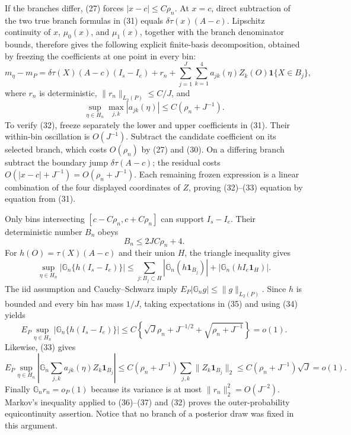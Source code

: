 If the branches differ, (27) forces \(|x-c|\le C\rho_n\).  At \(x=c\), direct subtraction of the two true branch formulas in (31) equals
\(\delta\tau(x)(A-c)\).  Lipschitz continuity of \(x\), \(\mu_0(x)\), and \(\mu_1(x)\), together with the branch denominator bounds, therefore gives the following explicit finite-basis decomposition, obtained by freezing the coefficients at one point in every bin:
\begin{equation}
 m_\eta-m_P
 =\delta\tau(X)(A-c)(I_s-I_e)+r_n+
   \sum_{j=1}^J\sum_{k=1}^4 a_{jk}(\eta)Z_k(O)\mathbf1\{X\in B_j\},                    \tag{32}
\end{equation}
where \(r_n\) is deterministic, \(\|r_n\|_{L_2(P)}\le C/J\), and
\begin{equation}
 \sup_{\eta\in H_n}\max_{j,k}|a_{jk}(\eta)|\le C(\rho_n+J^{-1}).                      \tag{33}
\end{equation}
To verify (32), freeze separately the lower and upper coefficients in (31).  Their within-bin oscillation is \(O(J^{-1})\).  Subtract the candidate coefficient on its selected branch, which costs \(O(\rho_n)\) by (27) and (30).  On a differing branch subtract the boundary jump \(\delta\tau(A-c)\); the residual costs \(O(|x-c|+J^{-1})=O(\rho_n+J^{-1})\).  Each remaining frozen expression is a linear combination of the four displayed coordinates of \(Z\), proving (32)--(33) equation by equation from (31).

Only bins intersecting \([c-C\rho_n,c+C\rho_n]\) can support \(I_s-I_e\).  Their deterministic number \(B_n\) obeys
\begin{equation}
 B_n\le2JC\rho_n+4.                                                                      \tag{34}
\end{equation}
For \(h(O)=\tau(X)(A-c)\) and their union \(H\), the triangle inequality gives
\begin{equation}
 \sup_{\eta\in H_n}|\mathbb G_n\{h(I_s-I_e)\}|
 \le\sum_{j:B_j\subset H}|\mathbb G_n(h\mathbf1_{B_j})|
     +|\mathbb G_n(hI_e\mathbf1_H)|.                                                     \tag{35}
\end{equation}
The iid assumption and Cauchy--Schwarz imply
\(E_P|\mathbb G_ng|\le\|g\|_{L_2(P)}\).  Since \(h\) is bounded and every bin has mass \(1/J\), taking expectations in (35) and using (34) yields
\begin{equation}
 E_P\sup_{\eta\in H_n}|\mathbb G_n\{h(I_s-I_e)\}|
 \le C\left\{\sqrt J\rho_n+J^{-1/2}+\sqrt{\rho_n+J^{-1}}\right\}=o(1).               \tag{36}
\end{equation}
Likewise, (33) gives
\begin{equation}
 E_P\sup_{\eta\in H_n}\left|
 \mathbb G_n\sum_{j,k}a_{jk}(\eta)Z_k\mathbf1_{B_j}\right|
 \le C(\rho_n+J^{-1})\sum_{j,k}\|Z_k\mathbf1_{B_j}\|_2
 \le C(\rho_n+J^{-1})\sqrt J=o(1).                                                      \tag{37}
\end{equation}
Finally \(\mathbb G_nr_n=o_P(1)\) because its variance is at most
\(\|r_n\|_2^2=O(J^{-2})\).  Markov's inequality applied to (36)--(37) and (32) proves the outer-probability equicontinuity assertion.  Notice that no branch of a posterior draw was fixed in this argument.

